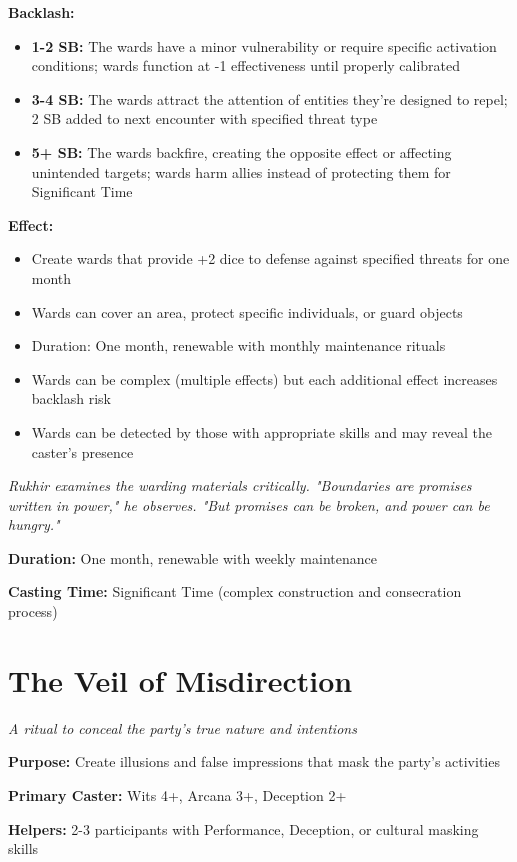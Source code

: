 \documentclass[12pt,twoside]{book}
\newcommand{\shadow}[1]{\textit{#1}}
\begin{document}
\textbf{Backlash:}
\begin{itemize}
\item \textbf{1-2 SB:} The wards have a minor vulnerability or require specific activation conditions; wards function at -1 effectiveness until properly calibrated
\item \textbf{3-4 SB:} The wards attract the attention of entities they're designed to repel; 2 SB added to next encounter with specified threat type
\item \textbf{5+ SB:} The wards backfire, creating the opposite effect or affecting unintended targets; wards harm allies instead of protecting them for Significant Time
\end{itemize}

\textbf{Effect:}
\begin{itemize}
\item Create wards that provide +2 dice to defense against specified threats for one month
\item Wards can cover an area, protect specific individuals, or guard objects
\item Duration: One month, renewable with monthly maintenance rituals
\item Wards can be complex (multiple effects) but each additional effect increases backlash risk
\item Wards can be detected by those with appropriate skills and may reveal the caster's presence
\end{itemize}

\shadow{Rukhir examines the warding materials critically. "Boundaries are promises written in power," he observes. "But promises can be broken, and power can be hungry."}

\textbf{Duration:} One month, renewable with weekly maintenance

\textbf{Casting Time:} Significant Time (complex construction and consecration process)

\section*{The Veil of Misdirection}
\textit{A ritual to conceal the party's true nature and intentions}

\textbf{Purpose:} Create illusions and false impressions that mask the party's activities

\textbf{Primary Caster:} Wits 4+, Arcana 3+, Deception 2+

\textbf{Helpers:} 2-3 participants with Performance, Deception, or cultural masking skills
\end{document}
